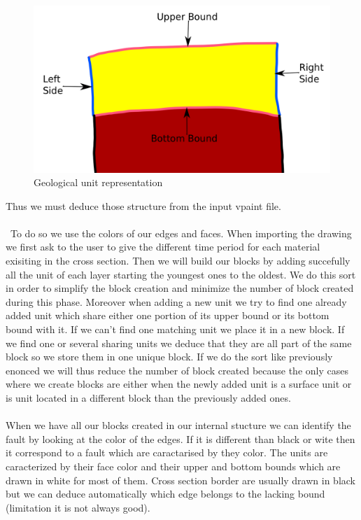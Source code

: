 \documentclass[12pt, a4paper]{memoir} %
\begin{document}
 \begin{figure}[H]
	\centering
	\includegraphics[scale=0.3]{unitDescriptionEdit.png}
	\caption{Geological unit representation}
\end{figure}

Thus we must deduce those structure from the input vpaint file. \\\\\
To do so we use the colors of our edges and faces. When importing the drawing we first ask to the user to give the different time period for each material exisiting in the cross section. Then we will build our blocks by adding succefully all the unit of each layer starting the youngest ones to the oldest. We do this sort in order to simplify the block creation and minimize the number of block created during this phase. Moreover when adding a new unit we try to find one already added unit which share either one portion of its upper bound  or its bottom bound with it. If we can't find one matching unit we place it in a new block. If we find one or several sharing units we deduce that they are all part of the same block so we store them in one unique block. If we do the sort like previously enonced we will thus reduce the number of block created because the only cases where we create blocks are either when the newly added unit is a surface unit or is unit located in a different block than the previously added ones.\\\\

When we have all our blocks created in our internal stucture we can identify the fault by looking at the color of the edges. If it is different than black or wite then it correspond to a fault which are caractarised by they color. The units are caracterized by their face color and their upper and bottom bounds which are drawn in white for most of them. Cross section border are usually drawn in black but we can deduce automatically which edge belongs to the lacking bound (limitation it is not always good).\\\\
\end{document}
